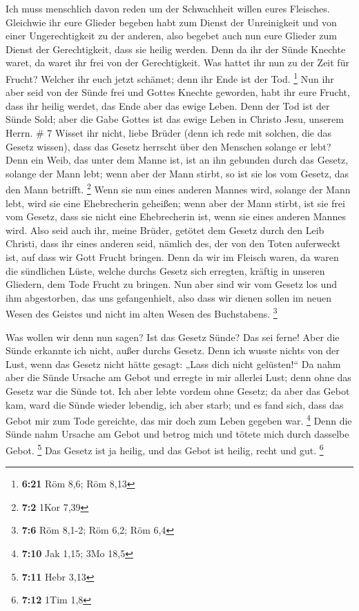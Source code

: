  Ich muss menschlich davon reden um der Schwachheit
willen eures Fleisches. Gleichwie ihr eure Glieder begeben habt zum
Dienst der Unreinigkeit und von einer Ungerechtigkeit zu der anderen,
also begebet auch nun eure Glieder zum Dienst der Gerechtigkeit, dass
sie heilig werden.  Denn da ihr der Sünde Knechte waret,
da waret ihr frei von der Gerechtigkeit.  Was hattet ihr
nun zu der Zeit für Frucht? Welcher ihr euch jetzt schämet; denn ihr
Ende ist der Tod. \footnote{\textbf{6:21} Röm 8,6; Röm 8,13}
 Nun ihr aber seid von der Sünde frei und Gottes Knechte
geworden, habt ihr eure Frucht, dass ihr heilig werdet, das Ende aber
das ewige Leben.  Denn der Tod ist der Sünde Sold; aber
die Gabe Gottes ist das ewige Leben in Christo Jesu, unserem Herrn. \# 7
 Wisset ihr nicht, liebe Brüder (denn ich rede mit
solchen, die das Gesetz wissen), dass das Gesetz herrscht über den
Menschen solange er lebt?  Denn ein Weib, das unter dem
Manne ist, ist an ihn gebunden durch das Gesetz, solange der Mann lebt;
wenn aber der Mann stirbt, so ist sie los vom Gesetz, das den Mann
betrifft. \footnote{\textbf{7:2} 1Kor 7,39}  Wenn sie nun
eines anderen Mannes wird, solange der Mann lebt, wird sie eine
Ehebrecherin geheißen; wenn aber der Mann stirbt, ist sie frei vom
Gesetz, dass sie nicht eine Ehebrecherin ist, wenn sie eines anderen
Mannes wird.  Also seid auch ihr, meine Brüder, getötet
dem Gesetz durch den Leib Christi, dass ihr eines anderen seid, nämlich
des, der von den Toten auferweckt ist, auf dass wir Gott Frucht bringen.
 Denn da wir im Fleisch waren, da waren die sündlichen
Lüste, welche durchs Gesetz sich erregten, kräftig in unseren Gliedern,
dem Tode Frucht zu bringen.  Nun aber sind wir vom Gesetz
los und ihm abgestorben, das uns gefangenhielt, also dass wir dienen
sollen im neuen Wesen des Geistes und nicht im alten Wesen des
Buchstabens. \footnote{\textbf{7:6} Röm 8,1-2; Röm 6,2; Röm 6,4}

 Was wollen wir denn nun sagen? Ist das Gesetz Sünde? Das
sei ferne! Aber die Sünde erkannte ich nicht, außer durchs Gesetz. Denn
ich wusste nichts von der Lust, wenn das Gesetz nicht hätte gesagt:
„Lass dich nicht gelüsten!{}``  Da nahm aber die Sünde
Ursache am Gebot und erregte in mir allerlei Lust; denn ohne das Gesetz
war die Sünde tot.  Ich aber lebte vordem ohne Gesetz; da
aber das Gebot kam, ward die Sünde wieder lebendig,  ich
aber starb; und es fand sich, dass das Gebot mir zum Tode gereichte, das
mir doch zum Leben gegeben war. \footnote{\textbf{7:10} Jak 1,15; 3Mo
  18,5}  Denn die Sünde nahm Ursache am Gebot und betrog
mich und tötete mich durch dasselbe Gebot. \footnote{\textbf{7:11} Hebr
  3,13}  Das Gesetz ist ja heilig, und das Gebot ist
heilig, recht und gut. \footnote{\textbf{7:12} 1Tim 1,8}

